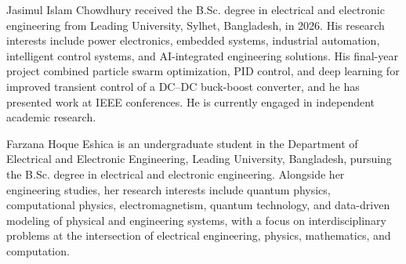 \begin{IEEEbiographynophoto}{Jasimul Islam Chowdhury}
received the B.Sc. degree in electrical and electronic engineering from Leading University, Sylhet, Bangladesh, in 2026. His research interests include power electronics, embedded systems, industrial automation, intelligent control systems, and AI-integrated engineering solutions. His final-year project combined particle swarm optimization, PID control, and deep learning for improved transient control of a DC--DC buck-boost converter, and he has presented work at IEEE conferences. He is currently engaged in independent academic research.
\end{IEEEbiographynophoto}

\begin{IEEEbiographynophoto}{Farzana Hoque Eshica}
is an undergraduate student in the Department of Electrical and Electronic Engineering, Leading University, Bangladesh, pursuing the B.Sc. degree in electrical and electronic engineering. Alongside her engineering studies, her research interests include quantum physics, computational physics, electromagnetism, quantum technology, and data-driven modeling of physical and engineering systems, with a focus on interdisciplinary problems at the intersection of electrical engineering, physics, mathematics, and computation.
\end{IEEEbiographynophoto}


